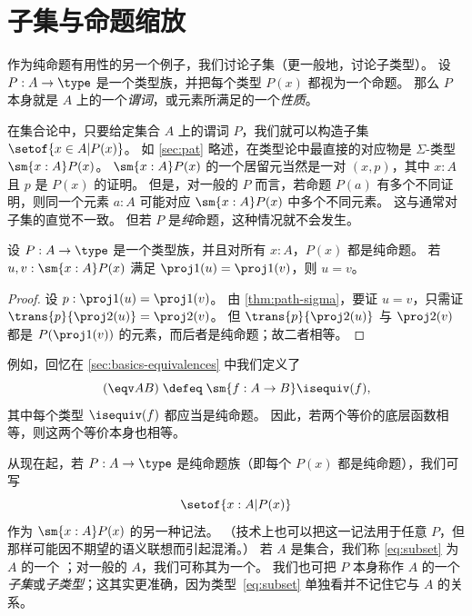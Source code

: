 %
%

\section{子集与命题缩放}
\label{subsec:prop-subsets}

%

作为纯命题有用性的另一个例子，我们讨论子集（更一般地，讨论子类型）。
设 $P:A\to\type$ 是一个类型族，并把每个类型 $P(x)$ 都视为一个命题。
那么 $P$ 本身就是 $A$ 上的一个\emph{谓词}，或元素所满足的一个\emph{性质}。

在集合论中，只要给定集合 $A$ 上的谓词 $P$，我们就可以构造子集 $\setof{x\in A | P(x)}$。
如 \cref{sec:pat} 略述，在类型论中最直接的对应物是 $\Sigma$-类型 $\sm{x:A} P(x)$。
$\sm{x:A} P(x)$ 的一个居留元当然是一对 $(x,p)$，其中 $x:A$ 且 $p$ 是 $P(x)$ 的证明。
但是，对一般的 $P$ 而言，若命题 $P(a)$ 有多个不同证明，则同一个元素 $a:A$ 可能对应 $\sm{x:A} P(x)$ 中多个不同元素。
这与通常对子集的直觉不一致。
但若 $P$ 是\emph{纯}命题，这种情况就不会发生。

\begin{lem}\label{thm:path-subset}
  设 $P:A\to\type$ 是一个类型族，并且对所有 $x:A$，$P(x)$ 都是纯命题。
  若 $u,v:\sm{x:A} P(x)$ 满足 $\proj1(u) = \proj1(v)$，则 $u=v$。
\end{lem}
\begin{proof}
  设 $p:\proj1(u) = \proj1(v)$。
  由 \cref{thm:path-sigma}，要证 $u=v$，只需证 $\trans{p}{\proj2(u)} = \proj2(v)$。
  但 $\trans{p}{\proj2(u)}$ 与 $\proj2(v)$ 都是 $P(\proj1(v))$ 的元素，而后者是纯命题；故二者相等。
\end{proof}

例如，回忆在 \cref{sec:basics-equivalences} 中我们定义了
\[(\eqv A B) \;\defeq\; \sm{f:A\to B} \isequiv (f),\]
其中每个类型 $\isequiv (f)$ 都应当是纯命题。
因此，若两个等价的底层函数相等，则这两个等价本身也相等。

\label{defn:setof}%
从现在起，若 $P:A\to \type$ 是纯命题族（即每个 $P(x)$ 都是纯命题），我们可写
%
\begin{equation}
  \label{eq:subset}
  \setof{x:A | P(x)}
\end{equation}
%
作为 $\sm{x:A} P(x)$ 的另一种记法。
（技术上也可以把这一记法用于任意 $P$，但那样可能因不期望的语义联想而引起混淆。）
若 $A$ 是集合，我们称 \eqref{eq:subset} 为 $A$ 的一个
%
%
；对一般的 $A$，我们可称其为一个。
%
我们也可把 $P$ 本身称作 $A$ 的一个\emph{子集}或\emph{子类型}；这其实更准确，因为类型~\eqref{eq:subset} 单独看并不记住它与 $A$ 的关系。

